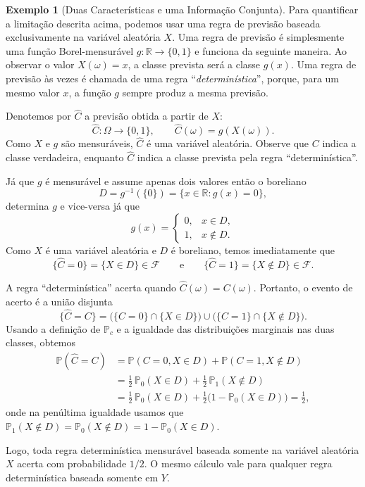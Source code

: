 \documentclass[12pt,portuguese]{article}
\theoremstyle{definition}
\newtheorem{example}[example]{Exemplo}
\theoremstyle{plainexercise}
\theoremstyle{starredexercise}
\theoremstyle{definition}
\begin{document}
\begin{example}[Duas Características e uma Informação Conjunta]
Para quantificar a limitação descrita acima, podemos usar uma
regra de previsão baseada exclusivamente na variável aleatória $X$. 
Uma regra de previsão é simplesmente uma função Borel-mensurável 
$g:\mathbb{R}\to\{0,1\}$ e funciona da seguinte maneira. 
Ao observar o valor $X(\omega)=x$, a classe prevista será a classe $g(x)$. 
Uma regra de previsão às vezes é chamada de uma regra ``\emph{determinística}'', 
porque, para um mesmo valor $x$, a função $g$ sempre produz a mesma previsão. 

Denotemos por $\widehat{C}$ a previsão obtida a partir de $X$:
\[
  \widehat{C}:\Omega\to\{0,1\},
  \qquad \widehat{C}(\omega)=g(X(\omega)).
\]
Como $X$ e $g$ são mensuráveis, $\widehat{C}$ é uma variável aleatória.
Observe que $C$ indica a classe verdadeira, enquanto $\widehat{C}$ indica
a classe prevista pela regra ``determinística''.

Já que $g$ é mensurável e assume apenas dois valores então o boreliano 
\[
  D=g^{-1}(\{0\})=\{x\in\mathbb{R}:g(x)=0\},
\]
determina $g$ e vice-versa já que 
\[
  g(x)=
  \begin{cases}
    0, & x\in D,\\[0.1cm]
    1, & x\notin D.
  \end{cases}
\]
Como $X$ é uma variável aleatória e $D$ é boreliano, temos imediatamente que
\[
  \{\widehat{C}=0\}=\{X\in D\}\in\mathcal{F}
	\qquad \text{e}\qquad 
  \{\widehat{C}=1\}=\{X\notin D\}\in\mathcal{F}.
\]

A regra ``determinística'' acerta quando $\widehat{C}(\omega)=C(\omega)$. Portanto, o evento de
acerto é a união disjunta
\[
  \{\widehat{C}=C\}
  =\bigl(\{C=0\}\cap\{X\in D\}\bigr)
   \cup\bigl(\{C=1\}\cap\{X\notin D\}\bigr).
\]
Usando a definição de $\mathbb{P}_c$ e a igualdade das distribuições
marginais nas duas classes, obtemos
\begin{align*}
  \mathbb{P}(\widehat{C}=C)
  &=\mathbb{P}(C=0,X\in D)+\mathbb{P}(C=1,X\notin D)
  \\[0.2cm]
  &=\tfrac12\,\mathbb{P}_0(X\in D)
    +\tfrac12\,\mathbb{P}_1(X\notin D)
  \\[0.2cm]
  &=\tfrac12\,\mathbb{P}_0(X\in D)
    +\tfrac12\bigl(1-\mathbb{P}_0(X\in D)\bigr)
  =\tfrac12,
\end{align*}
onde na penúltima igualdade usamos que 
$\mathbb{P}_1(X\notin D)=\mathbb{P}_0(X\notin D)=1-\mathbb{P}_0(X\in D)$.

Logo, toda regra determinística mensurável baseada somente na variável aleatória $X$ acerta com
probabilidade $1/2$.
O mesmo cálculo vale para qualquer regra determinística baseada somente em
$Y$. 



\end{example}
\end{document}
